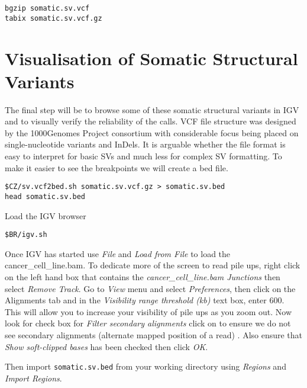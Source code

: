 \begin{steps}
\begin{lstlisting}
bgzip somatic.sv.vcf
tabix somatic.sv.vcf.gz
\end{lstlisting}
\end{steps}



\section{Visualisation of Somatic Structural Variants}

\begin{information}
The final step will be to browse some of these somatic structural variants in IGV and to visually verify the reliability of the calls. VCF file structure was designed by the 1000Genomes Project consortium with considerable focus being placed on single-nucleotide variants and InDels. It is arguable whether the file format is easy to interpret for basic SVs and much less for complex SV formatting. To make it easier to see the breakpoints we will create a bed file. 

\end{information}
\begin{steps}
\begin{lstlisting}
$CZ/sv.vcf2bed.sh somatic.sv.vcf.gz > somatic.sv.bed
head somatic.sv.bed
\end{lstlisting}
\end{steps}

\begin{steps}
Load the IGV browser 
\begin{lstlisting}
$BR/igv.sh
\end{lstlisting}
\end{steps}

\begin{information}
Once IGV has started use \emph{File} and \emph{Load from File} to load the cancer\_cell\_line.bam. To dedicate more of the screen to read pile ups, right click on the left hand box that contains the \emph{cancer\_cell\_line.bam Junctions} then select \emph{Remove Track}. Go to \emph{View} menu and select \emph{Preferences}, then click on the Alignments tab and in the \emph{Visibility range threshold (kb)} text box, enter 600. This will allow you to increase your visibility of pile ups as you zoom out. Now look for check box for \emph{Filter secondary alignments} click on to ensure we do not see secondary alignments (alternate mapped position of a read) . Also ensure that \emph{Show soft-clipped bases} has been checked then click \emph{OK}.
 
Then import \texttt{somatic.sv.bed} from your working directory using \emph{Regions} and \emph{Import Regions}. 

\end{information}

